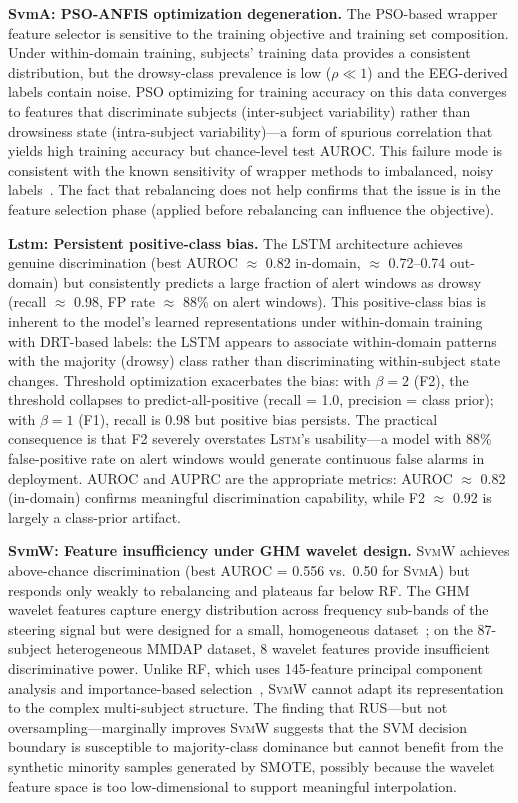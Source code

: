 \documentclass[lettersize,journal]{IEEEtran}
\newcommand{\Impl}[1]{\textsc{#1}}
\begin{document}
\textbf{SvmA: PSO-ANFIS optimization degeneration.}
The PSO-based wrapper feature selector is sensitive to the training objective and training set composition.
Under within-domain training, subjects' training data provides a consistent distribution, but the drowsy-class prevalence is low ($\rho \ll 1$) and the EEG-derived labels contain noise.
PSO optimizing for training accuracy on this data converges to features that discriminate subjects (inter-subject variability) rather than drowsiness state (intra-subject variability)---a form of spurious correlation that yields high training accuracy but chance-level test AUROC.
This failure mode is consistent with the known sensitivity of wrapper methods to imbalanced, noisy labels~\cite{he2009}.
The fact that rebalancing does not help confirms that the issue is in the feature selection phase (applied before rebalancing can influence the objective).

\textbf{Lstm: Persistent positive-class bias.}
The LSTM architecture achieves genuine discrimination (best AUROC $\approx$ 0.82 in-domain, $\approx$ 0.72--0.74 out-domain) but consistently predicts a large fraction of alert windows as drowsy (recall $\approx$ 0.98, FP rate $\approx$ 88\% on alert windows).
This positive-class bias is inherent to the model's learned representations under within-domain training with DRT-based labels: the LSTM appears to associate within-domain patterns with the majority (drowsy) class rather than discriminating within-subject state changes.
Threshold optimization exacerbates the bias: with $\beta = 2$ (F2), the threshold collapses to predict-all-positive (recall = 1.0, precision = class prior); with $\beta = 1$ (F1), recall is 0.98 but positive bias persists.
The practical consequence is that F2 severely overstates \Impl{Lstm}'s usability---a model with 88\% false-positive rate on alert windows would generate continuous false alarms in deployment.
AUROC and AUPRC are the appropriate metrics: AUROC $\approx$ 0.82 (in-domain) confirms meaningful discrimination capability, while F2 $\approx$ 0.92 is largely a class-prior artifact.

\textbf{SvmW: Feature insufficiency under GHM wavelet design.}
\Impl{SvmW} achieves above-chance discrimination (best AUROC = 0.556 vs.\ 0.50 for \Impl{SvmA}) but responds only weakly to rebalancing and plateaus far below RF.
The GHM wavelet features capture energy distribution across frequency sub-bands of the steering signal but were designed for a small, homogeneous dataset~\cite{zhao2012}; on the 87-subject heterogeneous MMDAP dataset, 8 wavelet features provide insufficient discriminative power.
Unlike RF, which uses 145-feature principal component analysis and importance-based selection~\cite{nakagama2026tiv}, \Impl{SvmW} cannot adapt its representation to the complex multi-subject structure.
The finding that RUS---but not oversampling---marginally improves \Impl{SvmW} suggests that the SVM decision boundary is susceptible to majority-class dominance but cannot benefit from the synthetic minority samples generated by SMOTE, possibly because the wavelet feature space is too low-dimensional to support meaningful interpolation.
\end{document}
